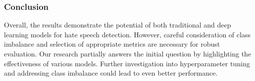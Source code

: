 \documentclass{article}
\begin{document}
\subsubsection*{Conclusion}
Overall, the results demonstrate the potential of both traditional and deep learning models for hate speech detection. However, careful consideration of class imbalance and selection of appropriate metrics are necessary for robust evaluation. Our research partially answers the initial question by highlighting the effectiveness of various models. Further investigation into hyperparameter tuning and addressing class imbalance could lead to even better performance.



\end{document}
